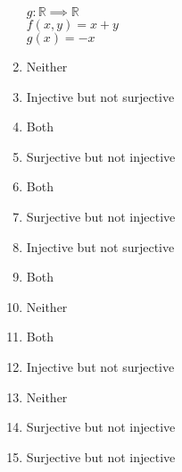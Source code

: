 \documentclass{article}
\begin{document}
\begin{enumerate}
			$g:\mathbb{R} \implies \mathbb{R}$\\
			$f(x,y) = x+y$\\
			$g(x) = -x$\\
		\item
			Neither	
		\item
			Injective but not surjective
		\item
			Both
		\item
			Surjective but not injective
		\item
			Both
		\item
			Surjective but not injective
		\item
			Injective but not surjective
		\item
			Both
		\item
			Neither
		\item
			Both
		\item
			Injective but not surjective
		\item
			Neither
		\item
			Surjective but not injective
		\item			
			Surjective but not injective
	\end{enumerate}
\end{document}
